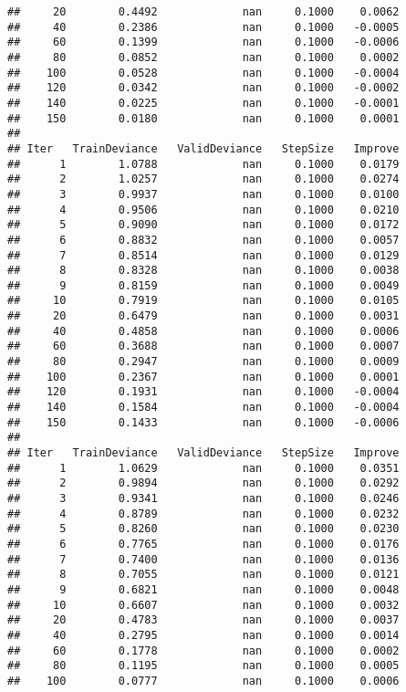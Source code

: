 \documentclass[]{article}
\begin{document}
\begin{verbatim}
##     20        0.4492             nan     0.1000    0.0062
##     40        0.2386             nan     0.1000   -0.0005
##     60        0.1399             nan     0.1000   -0.0006
##     80        0.0852             nan     0.1000    0.0002
##    100        0.0528             nan     0.1000   -0.0004
##    120        0.0342             nan     0.1000   -0.0002
##    140        0.0225             nan     0.1000   -0.0001
##    150        0.0180             nan     0.1000    0.0001
## 
## Iter   TrainDeviance   ValidDeviance   StepSize   Improve
##      1        1.0788             nan     0.1000    0.0179
##      2        1.0257             nan     0.1000    0.0274
##      3        0.9937             nan     0.1000    0.0100
##      4        0.9506             nan     0.1000    0.0210
##      5        0.9090             nan     0.1000    0.0172
##      6        0.8832             nan     0.1000    0.0057
##      7        0.8514             nan     0.1000    0.0129
##      8        0.8328             nan     0.1000    0.0038
##      9        0.8159             nan     0.1000    0.0049
##     10        0.7919             nan     0.1000    0.0105
##     20        0.6479             nan     0.1000    0.0031
##     40        0.4858             nan     0.1000    0.0006
##     60        0.3688             nan     0.1000    0.0007
##     80        0.2947             nan     0.1000    0.0009
##    100        0.2367             nan     0.1000    0.0001
##    120        0.1931             nan     0.1000   -0.0004
##    140        0.1584             nan     0.1000   -0.0004
##    150        0.1433             nan     0.1000   -0.0006
## 
## Iter   TrainDeviance   ValidDeviance   StepSize   Improve
##      1        1.0629             nan     0.1000    0.0351
##      2        0.9894             nan     0.1000    0.0292
##      3        0.9341             nan     0.1000    0.0246
##      4        0.8789             nan     0.1000    0.0232
##      5        0.8260             nan     0.1000    0.0230
##      6        0.7765             nan     0.1000    0.0176
##      7        0.7400             nan     0.1000    0.0136
##      8        0.7055             nan     0.1000    0.0121
##      9        0.6821             nan     0.1000    0.0048
##     10        0.6607             nan     0.1000    0.0032
##     20        0.4783             nan     0.1000    0.0037
##     40        0.2795             nan     0.1000    0.0014
##     60        0.1778             nan     0.1000    0.0002
##     80        0.1195             nan     0.1000    0.0005
##    100        0.0777             nan     0.1000    0.0006

\end{verbatim}
\end{document}
